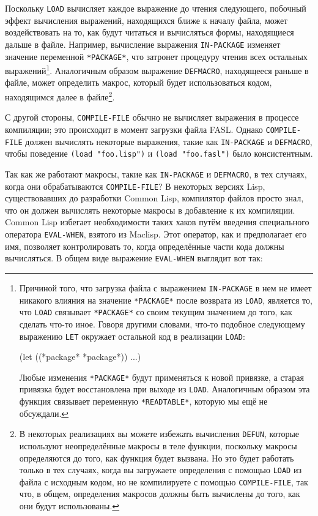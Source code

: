 Поскольку \lstinline{LOAD} вычисляет каждое выражение до чтения следующего, побочный эффект
вычисления выражений, находящихся ближе к началу файла, может воздействовать на то, как
будут читаться и вычисляться формы, находящиеся дальше в файле.  Например, вычисление
выражения \lstinline{IN-PACKAGE} изменяет значение переменной \lstinline{*PACKAGE*}, что затронет
процедуру чтения всех остальных выражений\footnote{Причиной того, что загрузка файла с
  выражением \lstinline{IN-PACKAGE} в нем не имеет никакого влияния на значение
  \lstinline{*PACKAGE*} после возврата из \lstinline{LOAD}, является то, что \lstinline{LOAD} связывает
  \lstinline{*PACKAGE*} со своим текущим значением до того, как сделать что-то иное.  Говоря
  другими словами, что-то подобное следующему выражению \lstinline{LET} окружает остальной код
  в реализации \lstinline{LOAD}:

\begin{myverb}
(let ((*package* *package*)) ...)
\end{myverb}

Любые изменения \lstinline{*PACKAGE*} будут применяться к новой привязке, а старая привязка
будет восстановлена при выходе из \lstinline{LOAD}.  Аналогичным образом эта функция связывает
переменную \lstinline{*READTABLE*}, которую мы ещё не обсуждали.}.  Аналогичным образом
выражение \lstinline{DEFMACRO}, находящееся раньше в файле, может определить макрос, который
будет использоваться кодом, находящимся далее в файле\footnote{В некоторых реализациях вы
  можете избежать вычисления \lstinline{DEFUN}, которые используют
  неопределённые макросы в теле функции, поскольку макросы определяются до того, как
  функция будет вызвана.  Но это будет работать только в тех случаях, когда вы загружаете
  определения с помощью \lstinline{LOAD} из файла с исходным кодом, но не компилируете с
  помощью \lstinline{COMPILE-FILE}, так что, в общем, определения макросов должны быть вычислены
  до того, как они будут использованы.}.

С другой стороны, \lstinline{COMPILE-FILE} обычно не вычисляет выражения в процессе компиляции;
это происходит в момент загрузки файла FASL. Однако \lstinline{COMPILE-FILE} должен вычислять
некоторые выражения, такие как \lstinline{IN-PACKAGE} и \lstinline{DEFMACRO}, чтобы поведение
\lstinline{(load "foo.lisp")} и \lstinline{(load "foo.fasl")} было консистентным.

Так как же работают макросы, такие как \lstinline{IN-PACKAGE} и \lstinline{DEFMACRO}, в тех случаях,
когда они обрабатываются \lstinline{COMPILE-FILE}?  В некоторых версиях Lisp, существовавших до
разработки Common Lisp, компилятор файлов просто знал, что он должен вычислять некоторые
макросы в добавление к их компиляции.  Common Lisp избегает необходимости таких хаков
путём введения специального оператора \lstinline{EVAL-WHEN}, взятого из Maclisp.  Этот оператор,
как и предполагает его имя, позволяет контролировать то, когда определённые части кода
должны вычисляться. В общем виде выражение \lstinline{EVAL-WHEN} выглядит вот так:

